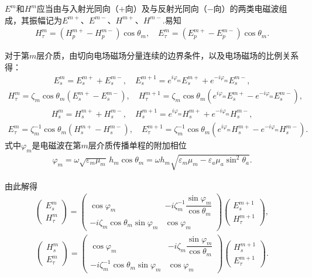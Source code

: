 \(E^m\)和\(H^m\)应当由与入射光同向（\(+\)向）及与反射光同向（\(-\)向）的两类电磁波组成，其振幅记为\(E^{m+}\)、\(E^{m-}\)、\(H^{m+}\)、\(H^{m-}\).易知
\begin{align*}
	H_\tau^m = (H_p^{m+} - H_p^{m-})\cos\theta_m,\quad E_\tau^m = (E_p^{m+} - E_p^{m-})\cos\theta_m.
\end{align*}

对于第\(m\)层介质，由切向电场磁场分量连续的边界条件，以及电场磁场的比例关系得：
\begin{align*}
	E_s^m = E_s^{m+} + E_s^{m-},\quad E_s^{m+1} = e^{i\varphi_m}E_s^{m+} + e^{-i\varphi_m}E_s^{m-},
\end{align*}
\begin{align*}
	H_\tau^m = \zeta_m\cos\theta_m(E_s^{m+} - E_s^{m-}),\quad H_\tau^{m+1} = \zeta_m\cos\theta_m(e^{i\varphi_m}E_s^{m+} - e^{-i\varphi_m}E_s^{m-}),
\end{align*}
\begin{align*}
	H_s^m = H_s^{m+} + H_s^{m-},\quad H_s^{m+1} = e^{i\varphi_m}H_s^{m+} + e^{-i\varphi_m}H_s^{m-},
\end{align*}
\begin{align*}
	E_\tau^m = \zeta_m^{-1}\cos\theta_m(H_s^{m+} - H_s^{m-}),\quad E_\tau^{m+1} = \zeta_m^{-1}\cos\theta_m(e^{i\varphi_m}H_s^{m+} - e^{-i\varphi_m}H_s^{m-}).
\end{align*}
式中\(\varphi_m\)是电磁波在第\(m\)层介质传播单程的附加相位
\begin{align*}
	\varphi_m = \omega\sqrt{\varepsilon_m\mu_m}\,h_m\cos\theta_m = \omega h_m\sqrt{\varepsilon_m\mu_m - \varepsilon_a\mu_a\sin^2\theta_a}.
\end{align*}

由此解得
\begin{align*}
	\begin{pmatrix}
		E_s^m \\
		H_\tau^m
	\end{pmatrix}
	=
	\begin{pmatrix}
		\cos\varphi_m                      & -i\zeta_m^{-1}\dfrac{\sin\varphi_m}{\cos\theta_m} \\
		-i\zeta_m\cos\theta_m\sin\varphi_m & \cos\varphi_m
	\end{pmatrix}
	\begin{pmatrix}
		E_s^{m+1} \\
		H_\tau^{m+1}
	\end{pmatrix},
\end{align*}
\begin{align*}
	\begin{pmatrix}
		H_s^m \\
		E_\tau^m
	\end{pmatrix}
	=
	\begin{pmatrix}
		\cos\varphi_m                           & -i\zeta_m\dfrac{\sin\varphi_m}{\cos\theta_m} \\
		-i\zeta_m^{-1}\cos\theta_m\sin\varphi_m & \cos\varphi_m
	\end{pmatrix}
	\begin{pmatrix}
		H_s^{m+1} \\
		E_\tau^{m+1}
	\end{pmatrix}.
\end{align*}

